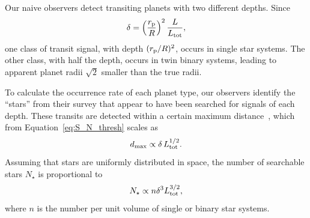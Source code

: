 \documentclass[12pt,modern]{aastex61}
\newcommand{\p}{_{\rm p}}
\begin{document}
Our naive observers detect transiting planets with two different
depths. Since 
\begin{equation}
    \delta = \left(\frac{r\p}{R}\right)^2 \frac{L}{L_{\rm tot}},
    \label{eq:delta_obs_general} 
\end{equation}
one class of transit signal, with depth $(r\p/R)^2$, occurs in single
star systems. The other class, with half the depth, occurs in twin
binary systems, leading to apparent planet radii $\sqrt{2}$ smaller
than the true radii.

To calculate the occurrence rate of each planet type, our observers
identify the ``stars'' from their survey that appear to have been
searched for signals of each depth.  These transits are detected
within a certain maximum
distance~\citep[see][]{pepper_using_2003,pepper_searching_2005}, which
from Equation~\ref{eq:S_N_thresh} scales as
\begin{equation}
  d_{\rm max} \propto \delta \, L_{\rm tot}^{1/2}.
  \label{eq:dmax}
\end{equation}
Assuming that stars are uniformly distributed in space, the number of
searchable stars $N_\star$ is proportional to
\begin{equation}
    N_\star \propto n \delta^3 L_{\rm tot}^{3/2},
\label{eq:N_searchable_prop}
\end{equation}
where $n$ is the number per unit volume of single or binary star
systems. 
\end{document}
